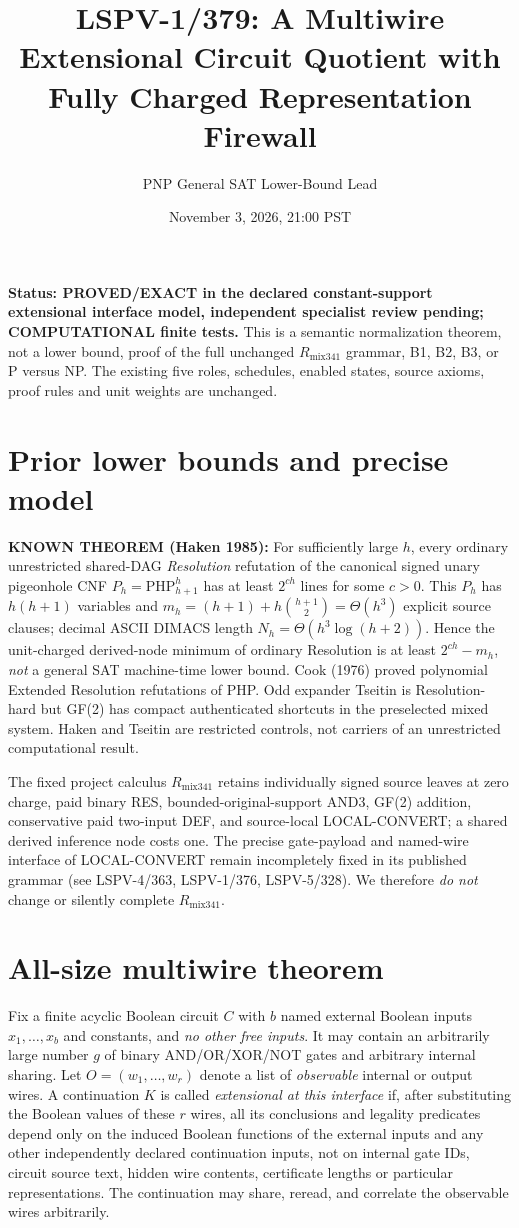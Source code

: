 \documentclass[11pt]{article}
\title{LSPV-1/379: A Multiwire Extensional Circuit Quotient with Fully Charged Representation Firewall}
\author{PNP General SAT Lower-Bound Lead}
\date{November 3, 2026, 21:00 PST}
\begin{document}
\maketitle
\noindent\textbf{Status: PROVED/EXACT in the declared constant-support extensional interface model, independent specialist review pending; COMPUTATIONAL finite tests.} This is a semantic normalization theorem, not a lower bound, proof of the full unchanged $R_{\mathrm{mix341}}$ grammar, B1, B2, B3, or P versus NP. The existing five roles, schedules, enabled states, source axioms, proof rules and unit weights are unchanged.

\section*{Prior lower bounds and precise model}
\noindent \textbf{KNOWN THEOREM (Haken 1985):} For sufficiently large $h$, every ordinary unrestricted shared-DAG \emph{Resolution} refutation of the canonical signed unary pigeonhole CNF $P_h=\mathrm{PHP}_{h+1}^{h}$ has at least $2^{ch}$ lines for some $c>0$. This $P_h$ has $h(h+1)$ variables and $m_h=(h+1)+h\binom{h+1}{2}=\Theta(h^3)$ explicit source clauses; decimal ASCII DIMACS length $N_h=\Theta(h^3\log(h+2))$. Hence the unit-charged derived-node minimum of ordinary Resolution is at least $2^{ch}-m_h$, \emph{not} a general SAT machine-time lower bound. Cook (1976) proved polynomial Extended Resolution refutations of PHP. Odd expander Tseitin is Resolution-hard but GF(2) has compact authenticated shortcuts in the preselected mixed system. Haken and Tseitin are restricted controls, not carriers of an unrestricted computational result.

The fixed project calculus $R_{\mathrm{mix341}}$ retains individually signed source leaves at zero charge, paid binary RES, bounded-original-support AND3, GF(2) addition, conservative paid two-input DEF, and source-local LOCAL-CONVERT; a shared derived inference node costs one. The precise gate-payload and named-wire interface of LOCAL-CONVERT remain incompletely fixed in its published grammar (see LSPV-4/363, LSPV-1/376, LSPV-5/328). We therefore \emph{do not} change or silently complete $R_{\mathrm{mix341}}$.

\section*{All-size multiwire theorem}
Fix a finite acyclic Boolean circuit $C$ with $b$ named external Boolean inputs $x_1,\ldots,x_b$ and constants, and \emph{no other free inputs}. It may contain an arbitrarily large number $g$ of binary AND/OR/XOR/NOT gates and arbitrary internal sharing. Let $O=(w_1,\ldots,w_r)$ denote a list of \emph{observable} internal or output wires. A continuation $K$ is called \emph{extensional at this interface} if, after substituting the Boolean values of these $r$ wires, all its conclusions and legality predicates depend only on the induced Boolean functions of the external inputs and any other independently declared continuation inputs, not on internal gate IDs, circuit source text, hidden wire contents, certificate lengths or particular representations. The continuation may share, reread, and correlate the observable wires arbitrarily.
\end{document}
